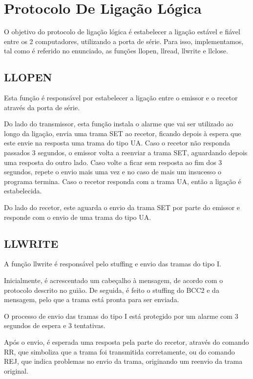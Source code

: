 \documentclass{article}
\begin{document}
\section{Protocolo De Ligação Lógica}

O objetivo do protocolo de ligação lógica é estabelecer a ligação estável e fiável entre os 2 computadores, utilizando a porta de série. Para isso, implementamos, tal como é referido no enunciado, as funções llopen, llread, llwrite e llclose.

\bigskip

\subsection{LLOPEN}

Esta função é responsável por estabelecer a ligação entre o emissor e o recetor através da porta de série.

Do lado do transmissor, esta função instala o alarme que vai ser utilizado ao longo da ligação, envia uma trama SET ao recetor, ficando depois à espera que este envie na resposta uma trama do tipo UA. Caso o recetor não responda passados 3 segundos, o emissor volta a reenviar a trama SET, aguardando depois uma resposta do outro lado. Caso volte a ficar sem resposta ao fim dos 3 segundos, repete o envio mais uma vez e no caso de mais um insucesso o programa termina. Caso o recetor responda com a trama UA, então a ligação é estabelecida.

Do lado do recetor, este aguarda o envio da trama SET por parte do emissor e responde com o envio de uma trama do tipo UA.

\subsection{LLWRITE}
A função llwrite é responsável pelo stuffing e envio das tramas do tipo I.

Inicialmente, é acrescentado um cabeçalho à mensagem, de acordo com o protocolo descrito no guião. De seguida, é feito o stuffing do BCC2 e da mensagem, pelo que a trama está pronta para ser enviada.

O processo de envio das tramas do tipo I está protegido por um alarme com 3 segundos de espera e 3 tentativas.

Após o envio, é esperada uma resposta pela parte do recetor, através do comando RR, que simboliza que a trama foi transmitida corretamente, ou do comando REJ, que indica problemas no envio da trama, originando um reenvio da trama original.
\end{document}
